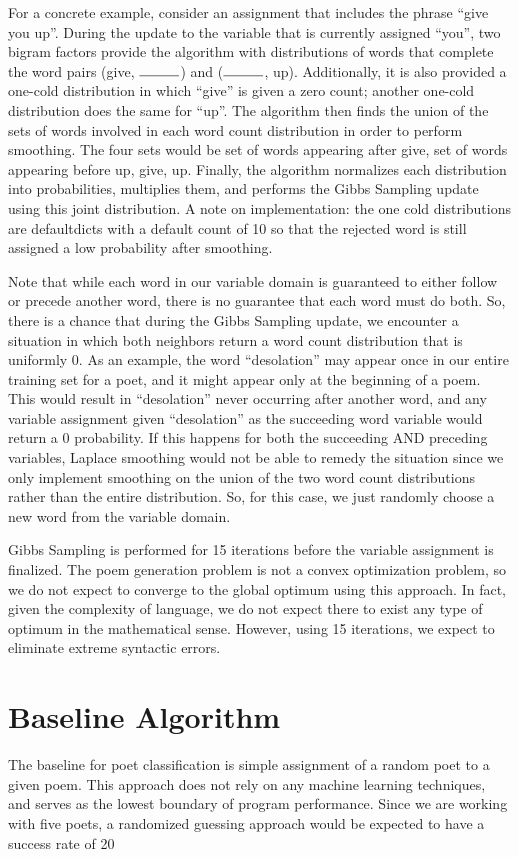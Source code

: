\documentclass[journal]{IEEEtran}
\begin{document}
For a concrete example, consider an assignment that includes the phrase “give you up”. During the update to the variable that is currently assigned “you”, two bigram factors provide the algorithm with  distributions of words that complete the word pairs (give, $\rule{1cm}{0.15mm}$) and ($\rule{1cm}{0.15mm}$, up). Additionally, it is also provided a one-cold distribution in which “give” is given a zero count; another one-cold distribution does the same for “up”. The algorithm then finds the union of the sets of words involved in each word count distribution in order to perform smoothing. The four sets would be {set of words appearing after give}, {set of words appearing before up}, {give}, {up}.  Finally, the algorithm normalizes each distribution into probabilities, multiplies them, and performs the Gibbs Sampling update using this joint  distribution. A note on implementation: the one cold distributions are defaultdicts with a default count of 10 so that the rejected word is still assigned a low probability after smoothing. 

Note that while each word in our variable domain is guaranteed to either follow or precede another word, there is no guarantee that each word must do both. So, there is a chance that during the Gibbs Sampling update, we encounter a situation in which both neighbors return a word count distribution that is uniformly 0. As an example, the word “desolation” may appear once in our entire training set for a poet, and it might appear only at the beginning of a poem. This would result in “desolation” never occurring after another word, and any variable assignment given “desolation” as the succeeding word variable would return a 0 probability. If this happens for both the succeeding AND preceding variables, Laplace smoothing would not be able to remedy the situation since we only implement smoothing on the union of the two word count distributions rather than the entire distribution. So, for this case, we just randomly choose a new word from the variable domain.

Gibbs Sampling is performed for 15 iterations before the variable assignment is finalized. The poem generation problem is not a convex optimization problem, so we do not expect to converge to the global optimum using this approach. In fact, given the complexity of language, we do not expect there to exist any type of optimum in the mathematical sense. However, using 15 iterations, we expect to eliminate extreme syntactic errors.

\section{Baseline Algorithm}
The baseline for poet classification is simple assignment of a random poet to a given poem. This approach does not rely on any machine learning techniques, and serves as the lowest boundary of program performance. Since we are working with five poets, a randomized guessing approach would be expected to have a success rate of 20%
\end{document}
